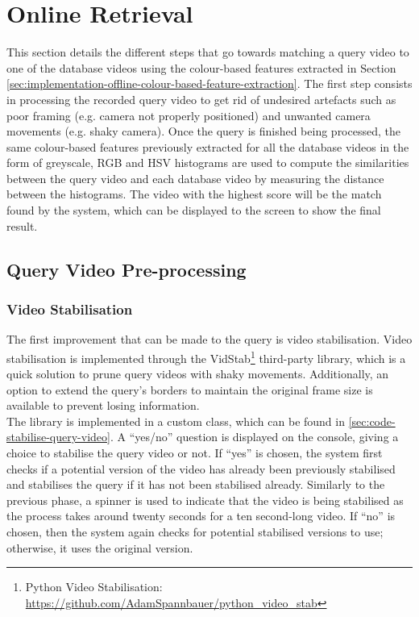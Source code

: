 \section{Online Retrieval}

This section details the different steps that go towards matching a query video to one of the database videos using the colour-based features extracted in Section \ref{sec:implementation-offline-colour-based-feature-extraction}. The first step consists in processing the recorded query video to get rid of undesired artefacts such as poor framing (e.g. camera not properly positioned) and unwanted camera movements (e.g. shaky camera). Once the query is finished being processed, the same colour-based features previously extracted for all the database videos in the form of greyscale, RGB and HSV histograms are used to compute the similarities between the query video and each database video by measuring the distance between the histograms. The video with the highest score will be the match found by the system, which can be displayed to the screen to show the final result.


\subsection{Query Video Pre-processing}

\subsubsection{Video Stabilisation}

The first improvement that can be made to the query is video stabilisation. Video stabilisation is implemented through the VidStab\footnote{Python Video Stabilisation: \url{https://github.com/AdamSpannbauer/python_video_stab}} third-party library, which is a quick solution to prune query videos with shaky movements. Additionally, an option to extend the query's borders to maintain the original frame size is available to prevent losing information.\\

The library is implemented in a custom class, which can be found in \ref{sec:code-stabilise-query-video}. A ``yes/no'' question is displayed on the console, giving a choice to stabilise the query video or not. If ``yes'' is chosen, the system first checks if a potential version of the video has already been previously stabilised and stabilises the query if it has not been stabilised already. Similarly to the previous phase, a spinner is used to indicate that the video is being stabilised as the process takes around twenty seconds for a ten second-long video. If ``no'' is chosen, then the system again checks for potential stabilised versions to use; otherwise, it uses the original version.

